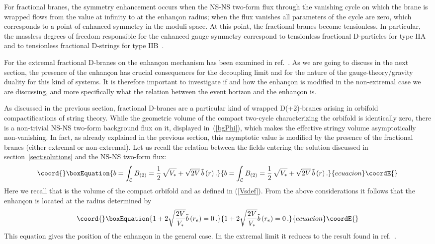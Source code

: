 \documentclass[a4paper,11pt]{article}
\providecommand{\eqref}[1]{(\ref{#1})}
\providecommand{\ZZ}{\mathbb{Z}}  \providecommand{\Zint}{\mathbb{Z}}
\begin{document}
For fractional branes, the symmetry enhancement occurs when the NS-NS 
two-form flux through the vanishing cycle on which the brane is wrapped
flows from the value \coordHE{} at infinity to \coordHE{} at the enhan\c{c}on radius; 
when the flux vanishes all parameters of the cycle are zero, which 
corresponds to a point of enhanced symmetry in the moduli space. 
At this point, the fractional branes become tensionless. In particular,
the massless degrees of freedom responsible for the enhanced gauge
symmetry correspond to tensionless fractional D-particles for type IIA
and to tensionless fractional D-strings for type IIB~\cite{Johnson:2000ch}.

For the extremal fractional D-branes on \myHighlight{$T^4\!/\ZZ_2$}\coordHE{} the enhan\c{c}on
mechanism has been examined in ref.~\cite{Frau:2000gk}. As we are
going to discuss in the next section, the presence of the enhan\c{c}on
has crucial consequences for the decoupling limit and for the nature
of the gauge-theory/gravity duality for this kind of systems. It is
therefore important to investigate if and how the enhan\c{c}on is
modified in the non-extremal case we are discussing, and more
specifically what the relation between the event horizon and the
enhan\c{c}on is.

As discussed in the previous section, fractional D\coordHE{}-branes are a
particular kind of wrapped D(\coordHE{}+2)-branes arising in orbifold
compactifications of string theory. While the geometric volume of the
compact two-cycle characterizing the orbifold is identically zero,
there is a non-trivial NS-NS two-form background flux on it, displayed
in~\eqref{bgPhi}, which makes the effective stringy volume
asymptotically non-vanishing. In fact, as already explained in the
previous section, this asymptotic value is modified by the presence of
the fractional branes (either extremal or non-extremal). Let us recall
the relation between the fields entering the solution discussed in
section~\ref{sect:solutions} and the NS-NS two-form flux:
\begin{equation}\coord{}\boxEquation{
b = \int_{\mathcal{C}} B_{(2)} = \frac{1}{2} \,\sqrt{V_*} +
\sqrt{2V}\, \tilde b\,(r) \,.
}{
b = \int_{\mathcal{C}} B_{(2)} = \frac{1}{2} \,\sqrt{V_*} +
\sqrt{2V}\, \tilde b\,(r) \,.
}{ecuacion}\coordE{}\end{equation}
Here we recall that \coordHE{} is the volume of the compact orbifold and
\coordHE{} as defined in \eqref{Vsdef}. {}From the
above considerations it follows that the enhan\c{c}on is located at
the radius \coordHE{} determined by
\begin{equation}\coord{}\boxEquation{
\label{eneq1}
1 + 2 \sqrt{\frac{2 V}{V_*}} \tilde b\,(r_e) = 0 \,.
}{
1 + 2 \sqrt{\frac{2 V}{V_*}} \tilde b\,(r_e) = 0 \,.
}{ecuacion}\coordE{}\end{equation}
This equation gives the position of the enhan\c{c}on in the general
case. In the extremal limit it reduces to the result found in
ref.~\cite{Frau:2000gk}.
\end{document}
